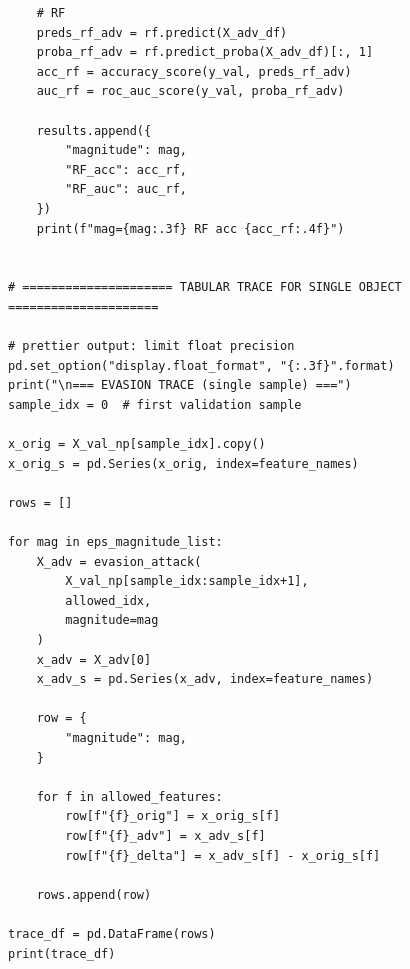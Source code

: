 \documentclass[14pt,a4paper]{extarticle}
\begin{document}
\begin{verbatim}
    # RF
    preds_rf_adv = rf.predict(X_adv_df)
    proba_rf_adv = rf.predict_proba(X_adv_df)[:, 1]
    acc_rf = accuracy_score(y_val, preds_rf_adv)
    auc_rf = roc_auc_score(y_val, proba_rf_adv)

    results.append({
        "magnitude": mag,
        "RF_acc": acc_rf,
        "RF_auc": auc_rf,
    })
    print(f"mag={mag:.3f} RF acc {acc_rf:.4f}")


# ===================== TABULAR TRACE FOR SINGLE OBJECT =====================

# prettier output: limit float precision
pd.set_option("display.float_format", "{:.3f}".format)
print("\n=== EVASION TRACE (single sample) ===")
sample_idx = 0  # first validation sample

x_orig = X_val_np[sample_idx].copy()
x_orig_s = pd.Series(x_orig, index=feature_names)

rows = []

for mag in eps_magnitude_list:
    X_adv = evasion_attack(
        X_val_np[sample_idx:sample_idx+1],
        allowed_idx,
        magnitude=mag
    )
    x_adv = X_adv[0]
    x_adv_s = pd.Series(x_adv, index=feature_names)

    row = {
        "magnitude": mag,
    }

    for f in allowed_features:
        row[f"{f}_orig"] = x_orig_s[f]
        row[f"{f}_adv"] = x_adv_s[f]
        row[f"{f}_delta"] = x_adv_s[f] - x_orig_s[f]

    rows.append(row)

trace_df = pd.DataFrame(rows)
print(trace_df)

\end{verbatim}
\end{document}
